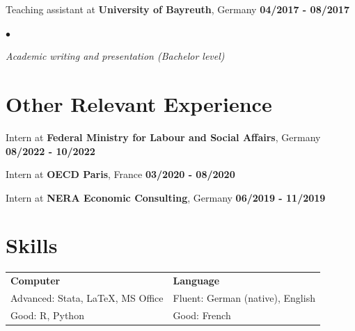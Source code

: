 \documentclass[margin, line]{res}
\newlength{\secvspace}
\newlength{\linevspace}
\newlength{\listvspace}
\newenvironment{list2}{
  \begin{list}{$\bullet$}{%
      \setlength{\itemsep}{0in}
      \setlength{\parsep}{0in} \setlength{\parskip}{0in}
      \setlength{\topsep}{0in} \setlength{\partopsep}{0in}
      \setlength{\leftmargin}{0.2in}}}{\end{list}}
\begin{document}
\begin{resume}
Teaching assistant at {\bf University of Bayreuth}, Germany \hfill {\bf 04/2017 - 08/2017} \\
\vspace*{\listvspace}
\begin{list2}
\item[] \textit{Academic writing and presentation (Bachelor level)}
\end{list2}
\vspace{\secvspace}

\section{ Other Relevant Experience}
Intern at {\bf Federal Ministry for Labour and Social Affairs}, Germany \hfill {\bf 08/2022 - 10/2022} \\
\vspace{\linevspace}

Intern at {\bf OECD Paris}, France \hfill {\bf 03/2020 - 08/2020} \\
\vspace{\linevspace}

Intern at {\bf NERA Economic Consulting}, Germany \hfill {\bf 06/2019 - 11/2019}\\

\vspace{\secvspace}

\section{ Skills}
\begin{tabular}{@{}p{2.3in}p{4in}}
\textbf{Computer}             & \textbf{Language} \\
Advanced: Stata, \LaTeX, MS Office   & Fluent: German (native), English \\
Good: R, Python  & Good: French \\
\end{tabular}
\vspace{\secvspace}

\end{resume}
\end{document}
